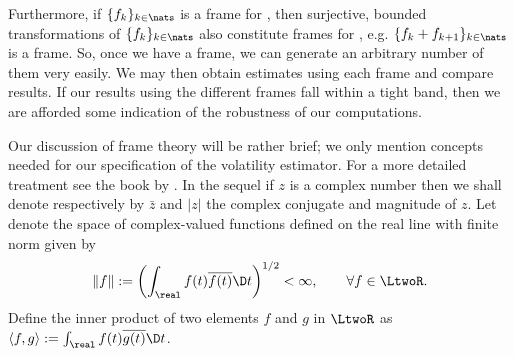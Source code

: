 Furthermore, if $\{f_k\}_{k \in \nats}$ is a frame for \hs, then surjective, bounded  transformations of $\{f_k\}_{k \in \nats}$  also constitute frames for \hs, e.g. $\{f_k + f_{k+1}\}_{k \in \nats}$ is a frame. So, once we have a frame, we can generate an arbitrary number of them very easily. We may then obtain estimates using each frame and compare results. If our results using the different frames fall within a tight band, then we are afforded some indication of the robustness of our computations.   



Our discussion of  frame theory will be  rather brief; we only mention concepts needed for our specification of the volatility estimator.  For a  more detailed treatment see the book by \cite{Christensen2008}. 
In the sequel if $z$ is a complex number then we shall denote respectively by $\bar{z}$ and $\vert z \vert$ the complex conjugate and magnitude of $z$. Let \LtwoR denote the space of complex-valued functions defined on the real line with finite norm given by 
\begin{align}
  \Vert f \Vert := \left(\int_\real f(t) \overline{f(t)} \D t\right)^{1/2} < \infty, \qquad \forall f \in \LtwoR.\notag
  \label{}
\end{align}
 Define the  inner product of two elements $f$ and $g$ in $\LtwoR$ as $\langle f,g\rangle :=  \int_\real f(t) \overline{g(t)} \D t$.


